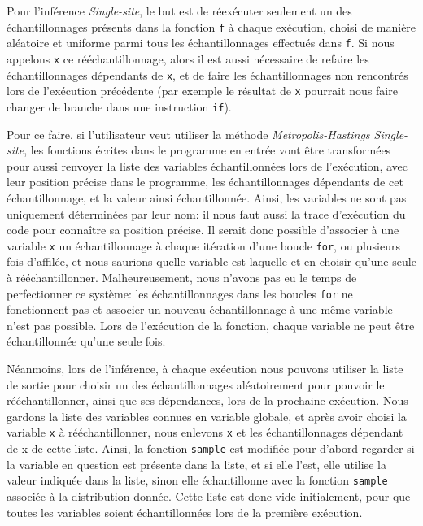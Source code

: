 \documentclass[svgnames]{article}
\begin{document}
Pour l'inférence \emph{Single-site}, le but est de réexécuter seulement un des échantillonnages présents dans la fonction \verb|f| à chaque exécution, choisi de manière aléatoire et uniforme parmi tous les échantillonnages effectués dans \verb|f|. Si nous appelons \verb|x| ce rééchantillonnage, alors il est aussi nécessaire de refaire les échantillonnages dépendants de \texttt x, et de faire les échantillonnages non rencontrés lors de l'exécution précédente (par exemple le résultat de \texttt x pourrait nous faire changer de branche dans une instruction \verb|if|).

Pour ce faire, si l'utilisateur veut utiliser la méthode \emph{Metropolis-Hastings Single-site}, les fonctions écrites dans le programme en entrée vont être transformées pour aussi renvoyer la liste des variables échantillonnées lors de l'exécution, avec leur position précise dans le programme, les échantillonnages dépendants de cet échantillonnage, et la valeur ainsi échantillonnée. Ainsi, les variables ne sont pas uniquement déterminées par leur nom: il nous faut aussi la trace d'exécution du code pour connaître sa position précise. Il serait donc possible d'associer à une variable \verb|x| un échantillonnage à chaque itération d'une boucle \verb|for|, ou plusieurs fois d'affilée, et nous saurions quelle variable est laquelle et en choisir qu'une seule à rééchantillonner. Malheureusement, nous n'avons pas eu le temps de perfectionner ce système: les échantillonnages dans les boucles \verb|for| ne fonctionnent pas et associer un nouveau échantillonnage à une même variable n'est pas possible. Lors de l'exécution de la fonction, chaque variable ne peut être échantillonnée qu'une seule fois.

Néanmoins, lors de l'inférence, à chaque exécution nous pouvons utiliser la liste de sortie pour choisir un des échantillonnages aléatoirement pour pouvoir le rééchantillonner, ainsi que ses dépendances, lors de la prochaine exécution. Nous gardons la liste des variables connues en variable globale, et après avoir choisi la variable \verb|x| à rééchantillonner, nous enlevons \verb|x| et les échantillonnages dépendant de x de cette liste. Ainsi, la fonction \verb|sample| est modifiée pour d'abord regarder si la variable en question est présente dans la liste, et si elle l'est, elle utilise la valeur indiquée dans la liste, sinon elle échantillonne avec la fonction \verb|sample| associée à la distribution donnée. Cette liste est donc vide initialement, pour que toutes les variables soient échantillonnées lors de la première exécution.
  
\end{document}
